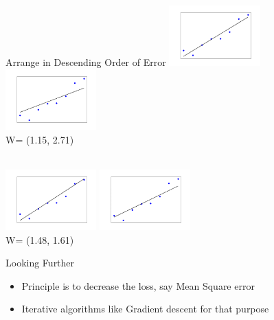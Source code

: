 \documentclass[aspectratio=169,14pt]{beamer}
\begin{document}
\begin{frame}[t]{Arrange in Descending Order of Error}
\vspace{-0.8ex}
\includegraphics[width=3.5cm]{Images/Lin_reg_Pic6.png}    
\hfill
\includegraphics[width=3.5cm]{Images/Lin_reg_Pic7.png} \\
\vspace{-1ex}
\hspace{1.9ex}{\footnotesize W= (1.92, 1.71)}
\hspace{35.3ex}
{\footnotesize W= (1.15, 2.71)} \\

\vspace{-2ex}
 \\

\vspace{-1.8ex}

\includegraphics[width=3.5cm]{Images/Lin_reg_Pic8.png}    
\hfill
\includegraphics[width=3.5cm]{Images/Lin_reg_Pic9.png} \\
\vspace{-1ex}
\hspace{1.1ex}{\footnotesize W= (2.12, 2.91)}
\hspace{34.3ex}
{\footnotesize W= (1.48, 1.61)} 
\end{frame}

\begin{frame}{Looking Further}

\begin{itemize}
  \item<1-> Principle is to decrease the loss, say \alert{Mean Square error}
\item<1-> Iterative algorithms like Gradient descent for that purpose
\end{itemize}
\end{frame}
\end{document}
